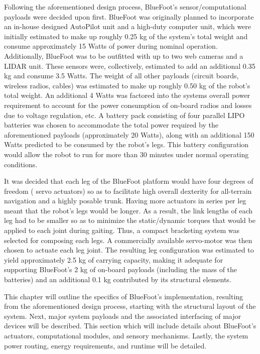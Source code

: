 	Following the aforementioned design process, BlueFoot's sensor/computational payloads were decided upon first. BlueFoot was originally planned to incorporate an in-house designed AutoPilot unit and a high-duty computer unit, which were initially estimated to make up roughly 0.25 kg of the system's total weight and consume approximately 15 Watts of power during nominal operation. Additionally, BlueFoot was to be outfitted with up to two web cameras and a LIDAR unit. These sensors were, collectively, estimated to add an additional 0.35 kg and consume 3.5 Watts. The weight of all other payloads (\IE circuit boards, wireless radios, cables) was estimated to make up roughly 0.50 kg of the robot's total weight. An additional 4 Watts was factored into the systems overall power requirement to account for the power consumption of on-board radios and losses due to voltage regulation, etc. A battery pack consisting of four parallel LIPO batteries was chosen to accommodate the total power required by the aforementioned payloads (approximately 20 Watts), along with an additional 150 Watts predicted to be consumed by the robot's legs. This battery configuration would allow the robot to run for more than 30 minutes under normal operating conditions. 

	It was decided that each leg of the BlueFoot platform would have four degrees of freedom ( servo actuators) so as to facilitate high overall dexterity for all-terrain navigation and a highly posable trunk. Having more actuators in series per leg meant that the robot's legs would be longer. As a result, the link lengths of each leg had to be smaller so as to minimize the static/dynamic torques that would be applied to each joint during gaiting. Thus, a compact bracketing system was selected for composing each legs. A commercially available servo-motor was then chosen to actuate each leg joint. The resulting leg configuration was estimated to yield approximately 2.5 kg of carrying capacity, making it adequate for supporting BlueFoot's 2 kg of on-board payloads (including the mass of the batteries) and an additional 0.1 kg contributed by its structural elements.





	This chapter will outline the specifics of BlueFoot's implementation, resulting from the aforementioned design process, starting with the structural layout of the system. Next, major system payloads and the associated interfacing of major devices will be described. This section which will include details about BlueFoot's actuators, computational modules, and sensory mechanisms. Lastly, the system power routing, energy requirements, and runtime will be detailed.

